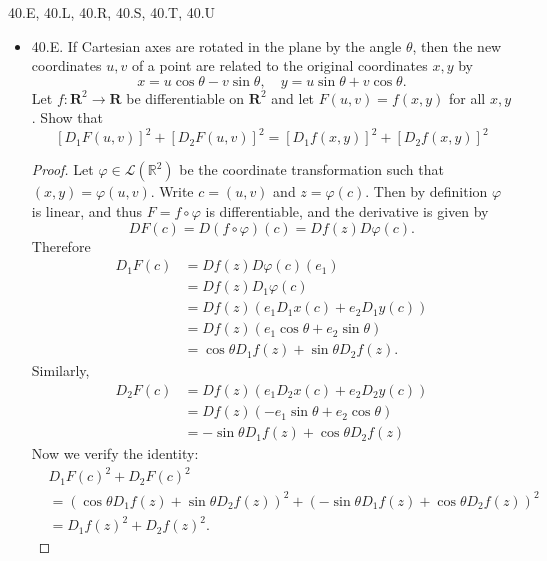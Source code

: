 
40.E, 40.L, 40.R, 40.S, 40.T, 40.U
\begin{itemize}
	\item 40.E. If Cartesian axes are rotated in the plane by the angle $\theta$, then the new coordinates $u, v$ of a point are related to the original coordinates $x, y$ by
\[
x=u \cos \theta-v \sin \theta, \quad y=u \sin \theta+v \cos \theta .
\]
Let $f: \mathbf{R}^2 \rightarrow \mathbf{R}$ be differentiable on $\boldsymbol{R}^2$ and let $F(u, v)=f(x, y)$ for all $x, y$. Show that
\[
\left[D_1 F(u, v)\right]^2+\left[D_2 F(u, v)\right]^2=\left[D_1 f(x, y)\right]^2+\left[D_2 f(x, y)\right]^2
\]
\begin{proof}
	Let $\varphi \in \mathcal{L}(\mathbb{R}^2)$ be the coordinate transformation such that $(x,y) = \varphi(u,v)$. Write $c = (u,v)$ and $z = \varphi(c)$. Then by definition $\varphi$ is linear, and thus $F = f \circ \varphi$ is differentiable, and the derivative is given by
	\[
		DF(c) = D(f \circ \varphi)(c) = Df(z) D\varphi(c)
	.\] 
	Therefore
	\begin{align*}
		D_1F(c) &= Df(z)D\varphi(c)(e_1) \\
			&= Df(z) D_1\varphi(c)\\
			&= Df(z) \left( e_1 D_1x(c) + e_2 D_1y(c) \right)  \\
			&= Df(z) (e_1 \cos \theta + e_2 \sin \theta) \\
			&= \cos \theta D_1 f(z) + \sin \theta D_2 f(z)
	.\end{align*} 
	Similarly,
	\begin{align*}
		D_2F(c) &= Df(z)\left( e_1 D_2x(c) + e_2 D_2 y(c) \right)  \\
		&= Df(z) \left(- e_1 \sin \theta + e_2 \cos \theta \right)  \\
		&= - \sin \theta D_1f(z) + \cos \theta D_2f(z)
	\end{align*}
	Now we verify the identity:
	\begin{align*}
		&D_1F\left( c \right) ^2 + D_2F(c)^2\\
		&=  \left( \cos \theta D_1 f(z) + \sin \theta D_2 f(z) \right) ^2+ 
		\left( - \sin \theta D_1f(z) + \cos \theta D_2f(z) \right) ^2 \\
		&=  D_1f(z)^2 + D_2f(z)^2
	.\end{align*}
\end{proof}


\end{itemize}
